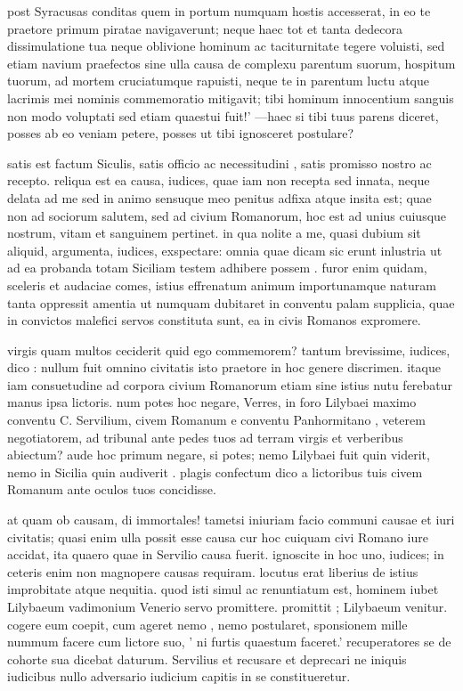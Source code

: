  post Syracusas conditas quem in portum numquam hostis accesserat, in eo te praetore primum piratae navigaverunt; neque haec tot et tanta dedecora dissimulatione tua neque oblivione hominum ac taciturnitate tegere voluisti, sed etiam navium praefectos sine ulla causa de complexu parentum suorum, hospitum tuorum, ad mortem cruciatumque rapuisti, neque te in parentum luctu atque lacrimis mei nominis commemoratio mitigavit; tibi hominum innocentium sanguis non modo voluptati sed etiam quaestui fuit!' —haec si tibi tuus parens diceret, posses ab eo veniam petere, posses ut tibi ignosceret postulare?

 satis est factum Siculis, satis officio ac necessitudini , satis promisso nostro ac recepto. reliqua est ea causa, iudices, quae iam non recepta sed innata, neque delata ad me sed in animo sensuque meo penitus adfixa atque insita est; quae non ad sociorum salutem, sed ad civium Romanorum, hoc est ad unius cuiusque nostrum, vitam et sanguinem pertinet. in qua nolite a me, quasi dubium sit aliquid, argumenta, iudices, exspectare: omnia quae dicam sic erunt inlustria ut ad ea probanda totam Siciliam testem adhibere possem . furor enim quidam, sceleris et audaciae comes, istius effrenatum animum importunamque naturam tanta oppressit amentia ut numquam dubitaret in conventu palam supplicia, quae in convictos malefici servos constituta sunt, ea in civis Romanos expromere.

 virgis quam multos ceciderit quid ego commemorem? tantum brevissime, iudices, dico : nullum fuit omnino civitatis isto praetore in hoc genere discrimen. itaque iam consuetudine ad corpora civium Romanorum etiam sine istius nutu ferebatur manus ipsa lictoris. num potes hoc negare, Verres, in foro Lilybaei maximo conventu C. Servilium, civem Romanum e conventu Panhormitano , veterem negotiatorem, ad tribunal ante pedes tuos ad terram virgis et verberibus abiectum? aude hoc primum negare, si potes; nemo Lilybaei fuit quin viderit, nemo in Sicilia quin audiverit . plagis confectum dico a lictoribus tuis civem Romanum ante oculos tuos concidisse.

 at quam ob causam, di immortales! tametsi iniuriam facio communi causae et iuri civitatis; quasi enim ulla possit esse causa cur hoc cuiquam civi Romano iure accidat, ita quaero quae in Servilio causa fuerit. ignoscite in hoc uno, iudices; in ceteris enim non magnopere causas requiram. locutus erat liberius de istius improbitate atque nequitia. quod isti simul ac renuntiatum est, hominem iubet Lilybaeum vadimonium Venerio servo promittere. promittit ; Lilybaeum venitur. cogere eum coepit, cum ageret nemo , nemo postularet, sponsionem mille nummum facere cum lictore suo, ' ni furtis quaestum faceret.' recuperatores se de cohorte sua dicebat daturum. Servilius et recusare et deprecari ne iniquis iudicibus nullo adversario iudicium capitis in se constitueretur.

